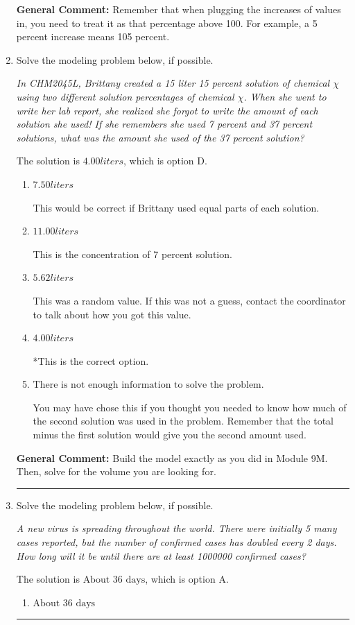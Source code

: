 \documentclass{extbook}[14pt]
\newcommand{\litem}[1]{\item #1

\rule{\textwidth}{0.4pt}}
\begin{document}
\begin{enumerate}
{\textbf{General Comment:} Remember that when plugging the increases of values in, you need to treat it as that percentage above 100. For example, a 5 percent increase means 105 percent.
}
\litem{
Solve the modeling problem below, if possible.

\begin{center}
    \textit{ In CHM2045L, Brittany created a 15 liter 15 percent solution of chemical $\chi$ using two different solution percentages of chemical $\chi$. When she went to write her lab report, she realized she forgot to write the amount of each solution she used! If she remembers she used 7 percent and 37 percent solutions, what was the amount she used of the 37 percent solution? }
\end{center}
The solution is \( 4.00 liters \), which is option D.\begin{enumerate}[label=\Alph*.]
\item \( 7.50 liters \)

This would be correct if Brittany used equal parts of each solution.
\item \( 11.00 liters \)

This is the concentration of 7 percent solution.
\item \( 5.62 liters \)

This was a random value. If this was not a guess, contact the coordinator to talk about how you got this value.
\item \( 4.00 liters \)

*This is the correct option.
\item \( \text{There is not enough information to solve the problem.} \)

You may have chose this if you thought you needed to know how much of the second solution was used in the problem. Remember that the total minus the first solution would give you the second amount used.
\end{enumerate}

\textbf{General Comment:} Build the model exactly as you did in Module 9M. Then, solve for the volume you are looking for.
}
\litem{
Solve the modeling problem below, if possible.

\begin{center}
    \textit{ A new virus is spreading throughout the world. There were initially 5 many cases reported, but the number of confirmed cases has doubled every 2 days. How long will it be until there are at least 1000000 confirmed cases? }
\end{center}
The solution is \( \text{About } 36 \text{ days} \), which is option A.\begin{enumerate}[label=\Alph*.]
\item \( \text{About } 36 \text{ days} \)


\end{enumerate}}
\end{enumerate}
\end{document}
